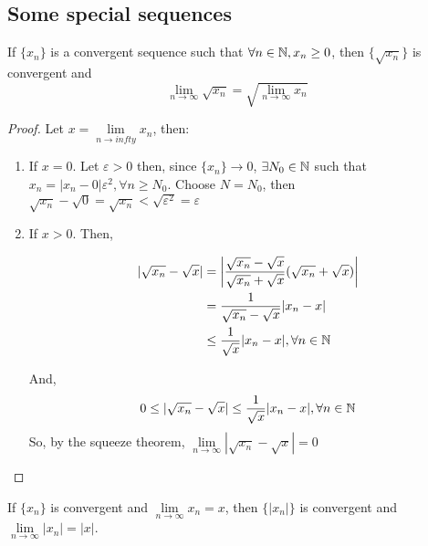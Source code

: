 \subsection{Some special sequences}

\begin{theorem}
    If $\{x_n\}$ is a convergent sequence such that $\forall n \in \mathbb{N}, x_n \geq 0$, then $\{\sqrt{x_n}\}$ is convergent and
    \begin{equation}
        \lim \limits_{n \to \infty} \sqrt{x_n} = \sqrt{\lim \limits_{n \to \infty} x_n}
    \end{equation}
\end{theorem}

\begin{proof}
    Let $x = \lim \limits_{n \to infty} x_n$, then:
    \begin{enumerate}
        \item If $x = 0$. Let $\varepsilon > 0$ then, since $\{x_n\} \to 0$, $\exists N_0 \in \mathbb{N}$ such that $x_n = |x_n-0| \varepsilon^2, \forall n \geq N_0$. Choose $N = N_0$, then $\sqrt{x_n}-\sqrt{0} = \sqrt{x_n} < \sqrt{\varepsilon^2} = \varepsilon$
        \item If $ x > 0$. Then, 
        
        \begin{align}
            |\sqrt{x_n} - \sqrt{x}| &= \left |
                \frac{\sqrt{x_n}-\sqrt{x}}{\sqrt{x_n}+\sqrt{x}}(\sqrt{x_n}+\sqrt{x})
            \right | \\
            &= \frac{1}{\sqrt{x_n} - \sqrt{x}}|x_n-x| \\
            &\leq \frac{1}{\sqrt{x}}|x_n-x|, \forall n \in \mathbb{N}
        \end{align}
        
        And,
        \begin{equation*}
            0 \leq |\sqrt{x_n}-\sqrt{x}| \leq \frac{1}{\sqrt{x}}|x_n-x|, \forall n \in \mathbb{N}
        \end{equation*}
        So, by the squeeze theorem, $\lim \limits_{n\to\infty} |\sqrt{x_n}-\sqrt{x}| = 0$
    \end{enumerate}
\end{proof}

\begin{theorem}
    If $\{x_n\}$ is convergent and $\lim \limits_{n\to\infty} x_n = x$, then $\{|x_n|\}$ is convergent and $\lim \limits_{n \to \infty} |x_n| = |x|$.
\end{theorem}


